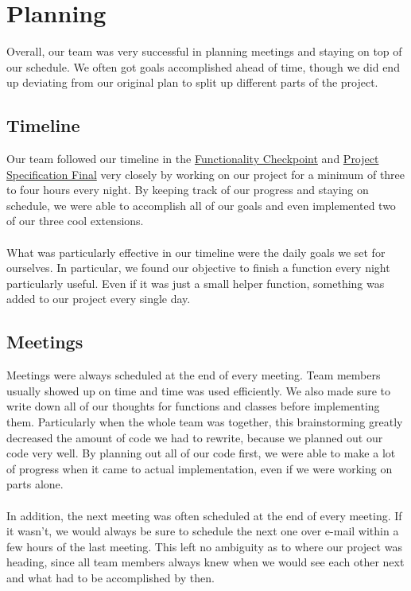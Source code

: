 \documentclass[11pt]{article}
\begin{document}
\pagebreak


\section{Planning}

Overall, our team was very successful in planning meetings and staying on top of our schedule. We often got goals accomplished ahead of time, though we did end up deviating from our original plan to split up different parts of the project.

\subsection{Timeline}

Our team followed our timeline in the \href{run:report/Functionality_Checkpoint.pdf}{Functionality Checkpoint} and \href{run:report/Final Project Specification (Final).pdf}{Project Specification Final} very closely by working on our project for a minimum of three to four hours every night. By keeping track of our progress and staying on schedule, we were able to accomplish all of our goals and even implemented two of our three cool extensions.
\\\\
What was particularly effective in our timeline were the daily goals we set for ourselves. In particular, we found our objective to finish a function every night particularly useful. Even if it was just a small helper function, something was added to our project every single day.


\subsection{Meetings}

Meetings were always scheduled at the end of every meeting. Team members usually showed up on time and time was used efficiently. We also made sure to write down all of our thoughts for functions and classes before implementing them. Particularly when the whole team was together, this brainstorming greatly decreased the amount of code we had to rewrite, because we planned out our code very well. By planning out all of our code first, we were able to make a lot of progress when it  came to actual implementation, even if we were working on parts alone.
\\\\
In addition, the next meeting was often scheduled at the end of every meeting. If it wasn't, we would always be sure to schedule the next one over e-mail within a few hours of the last meeting. This left no ambiguity as to where our project was heading, since all team members always knew when we would see each other next and what had to be accomplished by then.
\end{document}
